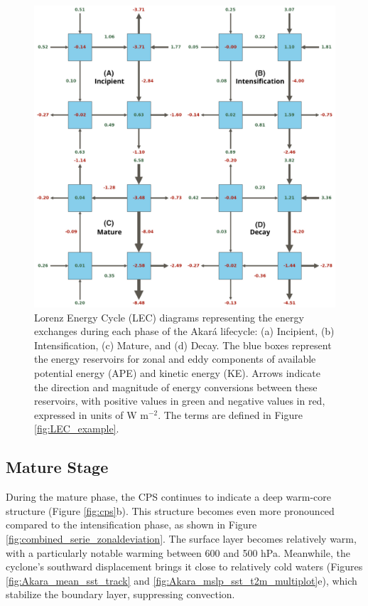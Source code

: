 \documentclass[pdflatex,sn-chicago]{sn-jnl}%
\theoremstyle{plain}
\theoremstyle{definition}
\theoremstyle{remark}
\theoremstyle{definition}
\begin{document}
\begin{figure}[h!]
\centering
\includegraphics[width=\textwidth]{lec.png}
\caption{Lorenz Energy Cycle (LEC) diagrams representing the energy exchanges during each phase of the Akará lifecycle: (a) Incipient, (b) Intensification, (c) Mature, and (d) Decay. The blue boxes represent the energy reservoirs for zonal and eddy components of available potential energy (APE) and kinetic energy (KE). Arrows indicate the direction and magnitude of energy conversions between these reservoirs, with positive values in green and negative values in red, expressed in units of W m\(^{-2}\). The terms are defined in Figure \ref{fig:LEC_example}.}
\label{fig:lec}
\end{figure}


\subsection{Mature Stage}

During the mature phase, the CPS continues to indicate a deep warm-core structure (Figure \ref{fig:cps}b). This structure becomes even more pronounced compared to the intensification phase, as shown in Figure \ref{fig:combined_serie_zonaldeviation}. The surface layer becomes relatively warm, with a particularly notable warming between 600 and 500 hPa. Meanwhile, the cyclone's southward displacement brings it close to relatively cold waters (Figures \ref{fig:Akara_mean_sst_track} and \ref{fig:Akara_mslp_sst_t2m_multiplot}e), which stabilize the boundary layer, suppressing convection.
\end{document}
